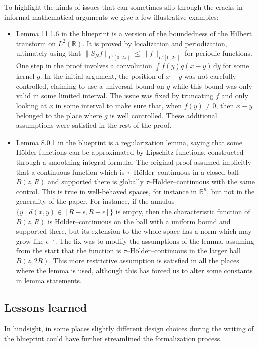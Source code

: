 \documentclass[12pt]{amsart}
\newcommand*{\ud}{\, \mathrm{d}}
\newcommand*{\real}{\mathbb{R}} %
\theoremstyle{definition}
\theoremstyle{plain}
\begin{document}
To highlight the kinds of issues that can sometimes slip through the cracks in informal mathematical arguments we give a few illustrative examples:



\begin{itemize}
\item Lemma 11.1.6 in the blueprint is a version of the boundedness of the
    Hilbert transform on $L^2(\real)$. It is proved by localization and
    periodization, ultimately using that $\|S_N f\|_{L^2[0,2\pi]} \leq
    \|f\|_{L^2[0,2\pi]}$ for periodic functions. One step in the proof
    involves a convolution $\int f(y) g(x-y) \ud y$ for some kernel $g$. In
    the initial argument, the position of $x-y$ was not carefully
    controlled, claiming to use a universal bound on $g$ while this bound
    was only valid in some limited interval. The issue was fixed by
    truncating $f$ and only looking at $x$ in some interval to make sure
    that, when $f(y)\ne 0$, then $x-y$ belonged to the place where $g$ is
    well controlled. These additional assumptions were satisfied in the
    rest of the proof.

\item Lemma 8.0.1 in the blueprint is a regularization lemma, saying that
    some Hölder functions can be approximated by Lipschitz functions,
    constructed through a smoothing integral formula. The original proof
    assumed implicitly that a continuous function which is
    $\tau$--Hölder--continuous in a closed ball $B(z,R)$ and supported
    there is globally $\tau$--Hölder--continuous with the same control.
    This is true in well-behaved spaces, for instance in $\real^n$, but not
    in the generality of the paper. For instance, if the annulus $\{y \mid
    d(x,y) \in [R-\epsilon, R+\epsilon]\}$ is empty, then the
    characteristic function of $B(z, R)$ is Hölder--continuous on the ball
    with a uniform bound and supported there, but its extension to the
    whole space has a norm which may grow like $\epsilon^{-\tau}$. The fix
    was to modify the assumptions of the lemma, assuming from the start
    that the function is $\tau$--Hölder--continuous in the larger ball
    $B(z, 2R)$. This more restrictive assumption is satisfied in all the
    places where the lemma is used, although this has forced us to alter
    some constants in lemma statements.
\end{itemize}

\subsection{Lessons learned}\label{subsec:blueprint_lessons}
In hindsight, in some places slightly different design choices during
the writing of the blueprint could have further streamlined the formalization process.
\end{document}
